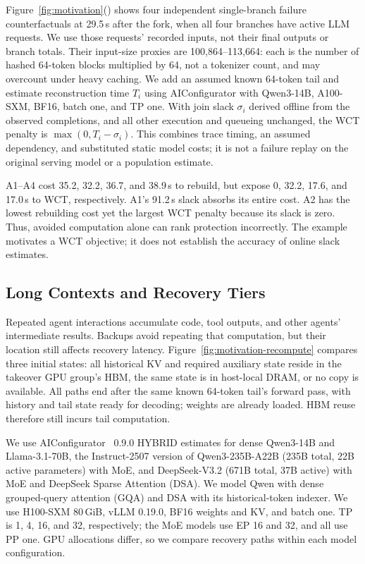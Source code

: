 Figure~\ref{fig:motivation}() shows
four independent single-branch failure counterfactuals at 29.5\,s after
the fork, when all four branches have active LLM requests. We use those
requests' recorded inputs, not their final outputs or branch totals.
Their input-size proxies are 100,864--113,664: each is the number of
hashed 64-token blocks multiplied by 64, not a tokenizer count, and may
overcount under heavy caching. We add an assumed known 64-token tail
and estimate reconstruction time $T_i$ using
AIConfigurator with Qwen3-14B, A100-SXM, BF16, batch one, and TP one.
With join slack $\sigma_i$ derived offline from the observed completions,
and all other execution and queueing unchanged, the WCT penalty is
$\max(0,T_i-\sigma_i)$. This combines trace timing, an assumed dependency,
and substituted static model costs; it is not a failure replay on the
original serving model or a population estimate.

A1--A4 cost 35.2, 32.2, 36.7, and 38.9\,s to rebuild, but expose
0, 32.2, 17.6, and 17.0\,s to WCT, respectively. A1's 91.2\,s slack
absorbs its entire cost. A2 has the lowest rebuilding cost yet the
largest WCT penalty because its slack is zero. Thus, avoided computation
alone can rank protection incorrectly. The example motivates a WCT
objective; it does not establish the accuracy of online slack estimates.

\subsection{Long Contexts and Recovery Tiers}
\label{sec:motivation-long-context}



Repeated agent interactions accumulate code, tool outputs, and other
agents' intermediate results. Backups avoid repeating that computation,
but their location still affects recovery latency.
Figure~\ref{fig:motivation-recompute} compares three initial states:
all historical KV and required auxiliary state reside in the takeover
GPU group's HBM, the same state is in host-local DRAM, or no copy is
available. All paths end after the same known 64-token tail's forward
pass, with history and tail state ready for decoding; weights are
already loaded. HBM reuse therefore still incurs tail computation.

We use AIConfigurator~\cite{nvidia2026aiconfigurator} 0.9.0 HYBRID estimates
for dense Qwen3-14B and Llama-3.1-70B, the Instruct-2507 version of
Qwen3-235B-A22B (235B total, 22B active parameters) with MoE, and DeepSeek-V3.2
(671B total, 37B active) with MoE and DeepSeek Sparse Attention (DSA).
We model Qwen with dense grouped-query attention (GQA) and DSA with its
historical-token indexer. We use
H100-SXM 80\,GiB, vLLM 0.19.0, BF16 weights and KV, and batch one.
TP is 1, 4, 16, and 32, respectively; the MoE models use EP 16 and 32,
and all use PP one. GPU allocations differ, so we compare recovery
paths within each model configuration.

